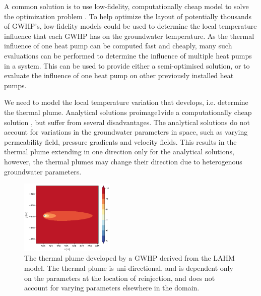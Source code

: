 \documentclass{article} %
\begin{document}
A common solution is to use low-fidelity, computationally cheap model to solve the optimization problem \cite{Sbai2019, Nagoor2019, Robinson2012}. 
To help optimize the layout of potentially thousands of GWHP's, low-fidelity models could be used to determine the local temperature influence that each GWHP has on the groundwater temperature. 
As the thermal influence of one heat pump can be computed fast and cheaply, many such evaluations can be performed to determine the influence of multiple heat pumps in a system. 
This can be used to provide either a semi-optimised solution, or to evaluate the influence of one heat pump on other previously installed heat pumps. 

We need to model the local temperature variation that develops, i.e. determine the thermal plume. 
Analytical solutions proimage1vide a computationally cheap solution \cite{Pophillat2020}, but suffer from several disadvantages. 
The analytical solutions do not account for variations in the groundwater parameters in space, such as varying permeability field, pressure gradients and velocity fields. 
This results in the thermal plume extending in one direction only for the analytical solutions, however, the thermal plumes may change their direction due to heterogenous groundwater parameters. 

\begin{figure}
\centering
\includegraphics[width=0.4\textwidth]{analyticalPlume.png}
\caption{The thermal plume developed by a GWHP derived from the LAHM model. The thermal plume is uni-directional, and is dependent only on the parameters at the location of reinjection, and does not account for varying parameters elsewhere in the domain.}
\label{analyticalPlume}
\end{figure}

\end{document}
